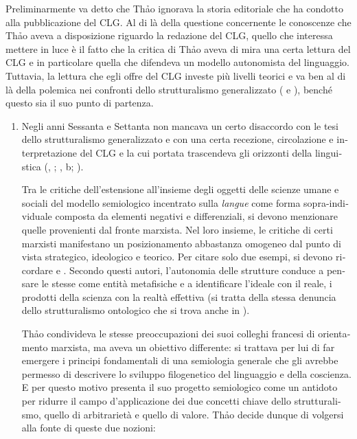 \documentclass[output=paper]{../langscibook}
\begin{document}
\begin{otherlanguage}{italian}
Preliminarmente va detto che Th\textlatin{ả}o ignorava la storia editoriale che ha condotto alla pubblicazione del CLG. Al di là della questione concernente le conoscenze che Th\textlatin{ả}o aveva a disposizione riguardo la redazione del CLG, quello che interessa mettere in luce è il fatto che la critica di Th\textlatin{ả}o aveva di mira una certa lettura del CLG e in particolare quella che difendeva un modello autonomista del linguaggio. Tuttavia, la lettura che egli offre del CLG investe più livelli teorici e va ben al di là della polemica nei confronti dello strutturalismo generalizzato (\citealt{chiss_structuralisme_2015} e \citealt{leon_historiographie_2013}), benché questo sia il suo punto di partenza.

\begin{enumerate}
\renewcommand{\labelenumi}{{\alph{enumi}})}

\item Negli anni Sessanta e Settanta non mancava un certo disaccordo con le tesi dello strutturalismo generalizzato e con una certa recezione, circolazione e interpretazione del CLG e la cui portata trascendeva gli orizzonti della linguistica (\citealt{dosse_histoire_1991}, \citeyear{dosse_histoire_1992}; \citealt{puech_lesprit_2013}, b; \citealt{lepschy_linguistica_1966}).

Tra le critiche dell’estensione all’insieme degli oggetti delle scienze umane e sociali del modello semiologico incentrato sulla \textit{langue} come forma sopra-individuale composta da elementi negativi e differenziali, si devono menzionare quelle provenienti dal fronte marxista. Nel loro insieme, le critiche di certi marxisti manifestano un posizionamento abbastanza omogeneo dal punto di vista strategico, ideologico e teorico. Per citare solo due esempi, si devono ricordare \citet{seve_structuralisme_1984} e \citet{lefebvre_au-a_1971}. Secondo questi autori, l’autonomia delle strutture conduce a pensare le stesse come entità metafisiche e a identificare l’ideale con il reale, i prodotti della scienza con la realtà effettiva (si tratta della stessa denuncia dello strutturalismo ontologico che si trova anche in \citealt{eco_struttura_1968}).

Th\textlatin{ả}o condivideva le stesse preoccupazioni dei suoi colleghi francesi di orientamento marxista, ma aveva un obiettivo differente: si trattava per lui di far emergere i principi fondamentali di una semiologia generale che gli avrebbe permesso di descrivere lo sviluppo filogenetico del linguaggio e della coscienza. E per questo motivo presenta il suo progetto semiologico come un antidoto per ridurre il campo d’applicazione dei due concetti chiave dello strutturalismo, quello di arbitrarietà e quello di valore. Th\textlatin{ả}o decide dunque di volgersi alla fonte di queste due nozioni:


\end{enumerate}
\end{otherlanguage}
\end{document}
